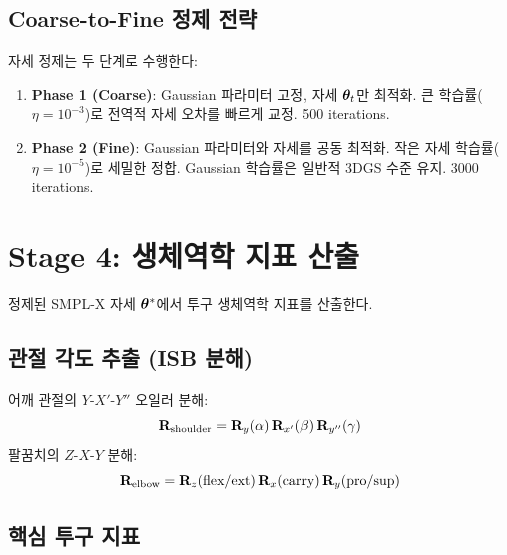 \documentclass[11pt, a4paper]{report}
\begin{document}
\subsection{Coarse-to-Fine 정제 전략}

자세 정제는 두 단계로 수행한다:

\begin{enumerate}[leftmargin=*]
  \item \textbf{Phase 1 (Coarse)}: Gaussian 파라미터 고정, 자세 $\bm{\theta}_t$만 최적화.
        큰 학습률($\eta = 10^{-3}$)로 전역적 자세 오차를 빠르게 교정. 500 iterations.

  \item \textbf{Phase 2 (Fine)}: Gaussian 파라미터와 자세를 공동 최적화.
        작은 자세 학습률($\eta = 10^{-5}$)로 세밀한 정합.
        Gaussian 학습률은 일반적 3DGS 수준 유지. 3000 iterations.
\end{enumerate}


\section{Stage 4: 생체역학 지표 산출}

정제된 SMPL-X 자세 $\bm{\theta}^*$에서 투구 생체역학 지표를 산출한다.

\subsection{관절 각도 추출 (ISB 분해)}

어깨 관절의 $Y$-$X'$-$Y''$ 오일러 분해:
\begin{equation}
  \mathbf{R}_{\text{shoulder}} = \mathbf{R}_y(\alpha)\,\mathbf{R}_{x'}(\beta)\,\mathbf{R}_{y''}(\gamma)
\end{equation}
팔꿈치의 $Z$-$X$-$Y$ 분해:
\begin{equation}
  \mathbf{R}_{\text{elbow}} = \mathbf{R}_z(\text{flex/ext})\,\mathbf{R}_x(\text{carry})\,\mathbf{R}_y(\text{pro/sup})
\end{equation}

\subsection{핵심 투구 지표}
\end{document}
